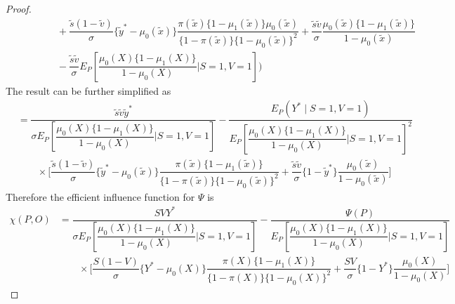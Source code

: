 \begin{proof}
\begin{align*}
    &\qquad \qquad + \dfrac{\tilde s( 1 -\tilde v)}{\sigma}\{\tilde y^* - \mu_0(\tilde x)\}\dfrac{\pi(\tilde x)\{1 - \mu_1(\tilde x)\}\mu_0(\tilde x)}{\{1 - \pi(\tilde x)\}\{1 - \mu_0(\tilde x)\}^2} + \dfrac{\tilde s \tilde v}{\sigma}\dfrac{\mu_0(\tilde x)\{1 - \mu_1(\tilde x)\}}{1 - \mu_0(\tilde x)} \\
    &\qquad \qquad - \dfrac{\tilde s\tilde v}{\sigma}E_P\left[\dfrac{\mu_0(X)\{1-\mu_1(X)\}}{1-\mu_0(X)}\bigg| S=1, V=1\right]\bigg)
\end{align*}
The result can be further simplified as
\begin{align*}
    &= \dfrac{\tilde s\tilde v\tilde y^*}{\sigma E_P\left[\dfrac{\mu_0(X)\{1 - \mu_1(X)\}}{1 - \mu_0(X)} \bigg| S=1, V=1\right]} - \dfrac{E_P(Y^*\mid S=1, V=1)}{E_P\left[\dfrac{\mu_0(X)\{1 - \mu_1(X)\}}{1 - \mu_0(X)}\bigg| S=1, V=1\right]^2} \\
    &\qquad \times \bigg[ \dfrac{\tilde s(1 - \tilde v)}{\sigma}\{\tilde y^* - \mu_0(\tilde x)\}\dfrac{\pi(\tilde x)\{1 - \mu_1(\tilde x)\}}{\{1 - \pi(\tilde x)\}\{1 - \mu_0(\tilde x)\}^2} + \dfrac{\tilde s \tilde v}{\sigma}\{1-\tilde y^*\}\dfrac{\mu_0(\tilde x)}{1 - \mu_0(\tilde x)}\bigg]
\end{align*}
Therefore the efficient influence function for $\Psi$ is 
\begin{align*}
     \chi(P, O) &= \dfrac{S V Y^*}{\sigma E_P\left[\dfrac{\mu_0(X)\{1 - \mu_1(X)\}}{1 - \mu_0(X)} \bigg| S=1, V=1\right]} - \dfrac{\Psi(P)}{E_P\left[\dfrac{\mu_0(X)\{1 - \mu_1(X)\}}{1 - \mu_0(X)}\bigg| S=1, V=1\right]} \\
    &\qquad \times \bigg[ \dfrac{S(1 - V)}{\sigma}\{Y^* - \mu_0(X)\}\dfrac{\pi(X)\{1 - \mu_1(X)\}}{\{1 - \pi(X)\}\{1 - \mu_0(X)\}^2} + \dfrac{S V}{\sigma}\{1-Y^*\}\dfrac{\mu_0(X)}{1 - \mu_0(X)}\bigg] 
\end{align*}
    \end{proof}

    

